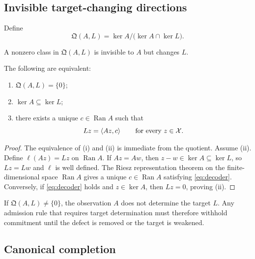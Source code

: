 \subsection{Invisible target-changing directions}

\begin{definition}
Define
\begin{equation}
\mathfrak Q(A,L)=\ker A\big/\bigl(\ker A\cap\ker L\bigr).
\label{eq:quotient}
\end{equation}
\end{definition}

A nonzero class in $\mathfrak Q(A,L)$ is invisible to $A$ but changes $L$.

\begin{theorem}
The following are equivalent:
\begin{enumerate}[label=(\roman*)]
\item $\mathfrak Q(A,L)=\{0\}$;
\item $\ker A\subseteq\ker L$;
\item there exists a unique $c\in\operatorname{Ran}A$ such that
\begin{equation}
Lz=\left\langle Az,c\right\rangle\qquad\text{for every }z\in\mathcal X.
\label{eq:decoder}
\end{equation}
\end{enumerate}
\end{theorem}

\begin{proof}
The equivalence of (i) and (ii) is immediate from the quotient. Assume (ii). Define $\ell(Az)=Lz$ on $\operatorname{Ran}A$. If $Az=Aw$, then $z-w\in\ker A\subseteq\ker L$, so $Lz=Lw$ and $\ell$ is well defined. The Riesz representation theorem on the finite-dimensional space $\operatorname{Ran}A$ gives a unique $c\in\operatorname{Ran}A$ satisfying \cref{eq:decoder}. Conversely, if \cref{eq:decoder} holds and $z\in\ker A$, then $Lz=0$, proving (ii).
\end{proof}

\begin{corollary}
If $\mathfrak Q(A,L)\neq\{0\}$, the observation $A$ does not determine the target $L$. Any admission rule that requires target determination must therefore withhold commitment until the defect is removed or the target is weakened.
\end{corollary}

\subsection{Canonical completion}

